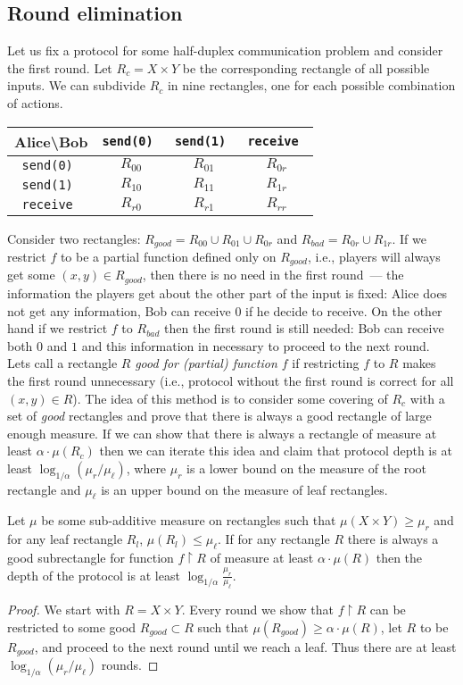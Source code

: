 \subsection{Round elimination}
Let us fix a protocol for some half-duplex communication problem and consider the first round. Let $R_c = X\times Y$ be the corresponding rectangle of all possible inputs.
We can subdivide $R_c$ in nine rectangles, one for each possible combination of actions.
\begin{center}
\begin{tabular}{c|c|c|c}
\bf Alice\textbackslash Bob &  \tt send(0) & \tt send(1) &  \tt receive \\\hline 
\tt send(0)  & $R_{00}$ & $R_{01}$ & $R_{0r}$ \\\hline
\tt send(1)  & $R_{10}$ & $R_{11}$ & $R_{1r}$ \\\hline
\tt receive  & $R_{r0}$ & $R_{r1}$ & $R_{rr}$ 
\end{tabular}
\end{center}
Consider two rectangles: $R_{good} = R_{00} \cup R_{01} \cup R_{0r}$ and $R_{bad} = R_{0r}\cup
R_{1r}$. If we restrict $f$ to be a partial function defined 
only on $R_{good}$, i.e., players will always get some 
$(x,y)\in R_{good}$, then there is no need in the first round~---
the information the players get about the other part of the input is fixed: Alice does not get any
information, Bob can receive $0$ if he decide to receive. On the other hand if we restrict $f$ to $R_{bad}$ then the first round is still needed: Bob can receive both $0$ and $1$ and
this information in necessary to proceed to the next round. Lets call a rectangle $R$ \emph{good for (partial) function $f$} if restricting $f$ to $R$ makes the first round unnecessary (i.e., protocol without the first round is correct for all $(x,y)\in R$).
The idea of this method is to consider some covering of $R_c$ with a set of \emph{good} rectangles and prove that there is always a good rectangle of large enough measure.  If we can show
that there is always a rectangle of measure at least $\alpha\cdot\mu(R_c)$ then 
we can iterate this idea and claim that protocol depth is at least 
$\log_{1/\alpha}(\mu_r/\mu_\ell)$, where $\mu_r$ is a lower bound 
on the measure of the root rectangle and $\mu_\ell$ is an upper bound 
on the measure of leaf rectangles.

\begin{lemma}\label{lm:rect-elim}
Let $\mu$ be some sub-additive measure on rectangles such that $\mu(X\times Y) \ge \mu_r$ and for
any leaf rectangle $R_l$, $\mu(R_l)\le \mu_\ell$. If for any rectangle $R$ 
there is always a good subrectangle for function $f\restriction R$ of measure at least $\alpha\cdot \mu(R)$ then the depth of the protocol is at least $\log_{1/\alpha} \frac{\mu_r}{\mu_\ell}$.
\end{lemma}
\begin{proof}
We start with $R = X\times Y$. Every round we show that $f \restriction R$ can be restricted 
to some good $R_{good} \subset R$ such that
$\mu(R_{good})\ge \alpha\cdot \mu(R)$, let $R$ to be $R_{good}$, and proceed to the next round
until we reach a leaf. Thus there are at least $\log_{1/\alpha}(\mu_r/\mu_\ell)$ rounds.
\end{proof}

